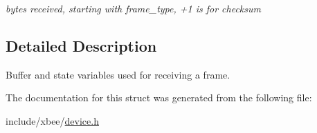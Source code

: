 \begin{DoxyCompactItemize}
\begin{DoxyCompactList}\small\item\em bytes received, starting with frame\-\_\-type, +1 is for checksum \end{DoxyCompactList}\end{DoxyCompactItemize}


\subsection{Detailed Description}
Buffer and state variables used for receiving a frame. 

The documentation for this struct was generated from the following file\-:\begin{DoxyCompactItemize}
\item 
include/xbee/\hyperlink{device_8h}{device.\-h}\end{DoxyCompactItemize}
